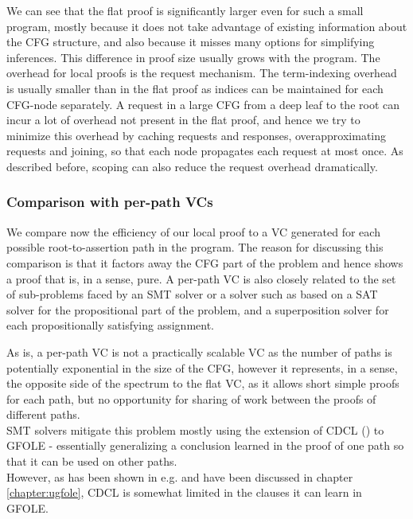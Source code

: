 We can see that the flat proof is significantly larger even for such a small program, mostly because it does not take advantage of existing information about the CFG structure, and also because it misses many options for simplifying inferences. 
This difference in proof size usually grows with the program.
The overhead for local proofs is the request mechanism. 
The term-indexing overhead is usually smaller than in the flat proof as indices can be maintained for each CFG-node separately. 
A request in a large CFG from a deep leaf to the root can incur a lot of overhead not present in the flat proof, and hence we try to minimize this overhead by caching requests and responses, overapproximating requests and joining, so that each node propagates each request at most once. 
As described before, scoping can also reduce the request overhead dramatically.


\subsubsection*{Comparison with per-path VCs}
We compare now the efficiency of our local proof to a VC generated for each possible root-to-assertion path in the program.
The reason for discussing this comparison is that it factors away the CFG part of the problem and hence shows a proof that is, in a sense, pure.
A per-path VC is also closely related to the set of sub-problems faced by an SMT solver or a solver such as \cite{Voronkov14} 
based on a SAT solver for the propositional part of the problem, and a superposition solver for each propositionally satisfying assignment.

As is, a per-path VC is not a practically scalable VC as the number of paths is potentially exponential in the size of the CFG, 
however it represents, in a sense, the opposite side of the spectrum to the flat VC, as it allows short simple proofs for each path, 
but no opportunity for sharing of work between the proofs of different paths.\\
SMT solvers mitigate this problem mostly using the extension of CDCL (\cite{GRASP}) to GFOLE - 
essentially generalizing a conclusion learned in the proof of one path so that it can be used on other paths.\\
However, as has been shown in e.g. \cite{DPLLJoin} and have been discussed in chapter \ref{chapter:ugfole}, 
CDCL is somewhat limited in the clauses it can learn in GFOLE.

